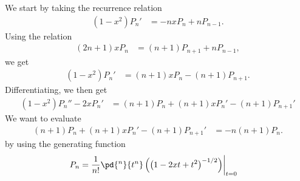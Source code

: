 \documentclass[10pt]{mypackage}
\begin{document}
\RaggedRight
\begin{solution}[32.20]
  We start by taking the recurrence relation
  \begin{align*}
    \left( 1-x^2 \right)P_n' &= -nxP_n + nP_{n-1}.
  \end{align*}
  Using the relation
  \begin{align*}
    \left( 2n+1 \right)xP_n &= \left( n+1 \right)P_{n+1} + nP_{n-1},
  \end{align*}
  we get
  \begin{align*}
    \left( 1-x^2 \right)P_n' &= \left( n+1 \right)xP_n - \left( n+1 \right)P_{n+1}.
  \end{align*}
  Differentiating, we then get
  \begin{align*}
    \left( 1-x^2 \right)P_n'' - 2xP_n' &= \left( n+1 \right)P_n + \left( n+1 \right)xP_n' - \left( n+1 \right)P_{n+1}'
  \end{align*}
  We want to evaluate
  \begin{align*}
    \left( n+1 \right)P_n + \left( n+1 \right)xP_n' - \left( n+1 \right)P_{n+1}' &= -n\left( n+1 \right)P_n.
  \end{align*}
  by using the generating function
  \begin{align*}
    P_n &= \frac{1}{n!}\pd{^n}{t^n}\left( \left( 1-2xt + t^2 \right)^{-1/2} \right)\biggr\vert_{t=0}
  \end{align*}
  
\end{solution}
\begin{solution}[32.21]

\end{solution}
\begin{solution}[32.23]

\end{solution}
\begin{solution}[35.4]

\end{solution}
\end{document}
